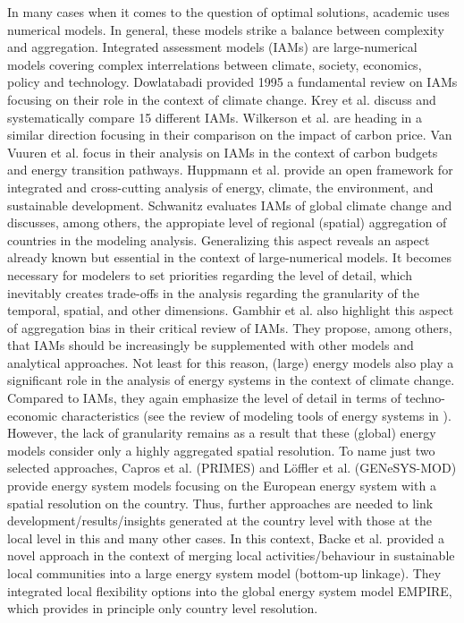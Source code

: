 In many cases when it comes to the question of optimal solutions, academic uses numerical models. In general, these models strike a balance between complexity and aggregation. Integrated assessment models (IAMs) are large-numerical models covering complex interrelations between climate, society, economics, policy and technology. Dowlatabadi \cite{dowlatabadi1995integrated} provided 1995 a fundamental review on IAMs focusing on their role in the context of climate change. Krey et al. \cite{krey2019looking} discuss and systematically compare 15 different IAMs. Wilkerson et al. \cite{wilkerson2015comparison} are heading in a similar direction focusing in their comparison on the impact of carbon price. Van Vuuren et al. \cite{van2016carbon} focus in their analysis on IAMs in the context of carbon budgets and energy transition pathways. Huppmann et al. \cite{huppmann2019messageix} provide an open framework for integrated and cross-cutting analysis of energy, climate, the environment, and sustainable development. Schwanitz \cite{schwanitz2013evaluating} evaluates IAMs of global climate change and discusses, among others, the appropiate level of regional (spatial) aggregation of countries in the modeling analysis. Generalizing this aspect reveals an aspect already known but essential in the context of large-numerical models. It becomes necessary for modelers to set priorities regarding the level of detail, which inevitably creates trade-offs in the analysis regarding the granularity of the temporal, spatial, and other dimensions. Gambhir et al. \cite{gambhir2019review} also highlight this aspect of aggregation bias in their critical review of IAMs. They propose, among others, that IAMs should be increasingly be supplemented with other models and analytical approaches. Not least for this reason, (large) energy models also play a significant role in the analysis of energy systems in the context of climate change. Compared to IAMs, they again emphasize the level of detail in terms of techno-economic characteristics (see the review of modeling tools of energy systems in \cite{ringkjob2018review}). However, the lack of granularity remains as a result that these (global) energy models consider only a highly aggregated spatial resolution. To name just two selected approaches, Capros et al. \cite{capros2012model} (PRIMES) and Löffler et al. \cite{loffler2017designing} (GENeSYS-MOD) provide energy system models focusing on the European energy system with a spatial resolution on the country. Thus, further approaches are needed to link development/results/insights generated at the country level with those at the local level in this and many other cases. In this context, Backe et al. \cite{backe2021heat} provided a novel approach in the context of merging local activities/behaviour in sustainable local communities into a large energy system model (bottom-up linkage). They integrated local flexibility options into the global energy system model EMPIRE, which provides in principle only country level resolution.\newline

